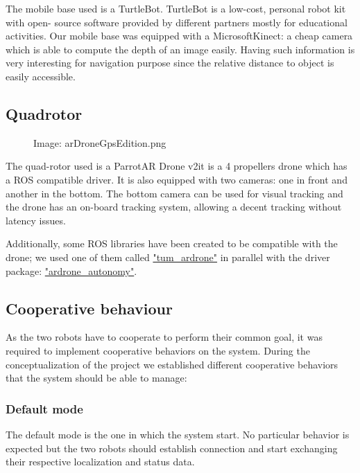\documentclass[11pt,a4paper]{article}
\newcommand{\centerImage}[1]{
	\begin{figure}[h]
	\centering
	Image: #1
	\end{figure}
}
\begin{document}
The mobile base used is a TurtleBot. TurtleBot is a low-cost, personal robot kit with open-
source software
provided by different partners mostly for educational activities.
Our mobile base was equipped with a Microsoft\textcopyright Kinect\texttrademark : a cheap 
camera which is
able to compute the depth of an image easily. Having such information is very interesting for 
navigation
purpose since the relative distance to object is easily accessible.

\subsection{Quadrotor}
\centerImage{arDroneGpsEdition.png}

The quad-rotor used is a Parrot\textcopyright AR Drone v2\texttrademark it is a 4 propellers
drone which has a ROS compatible driver. It is also equipped with two cameras: one in front
and another in the bottom. The bottom camera can be used for visual tracking and the drone
has an on-board tracking system, allowing a decent tracking without latency issues.

Additionally, some ROS libraries have been created to be compatible with the drone; we used
one of them called \href{"http://wiki.ros.org/tum_ardrone"}{"tum\_ardrone"} in parallel with
the driver package: \href{"https://github.com/AutonomyLab/ardrone_autonomy"}
{"ardrone\_autonomy"}.

\subsection{Cooperative behaviour}
As the two robots have to cooperate to perform their common goal, it was required to implement
cooperative behaviors on the system. During the conceptualization of the project we established different
cooperative behaviors that the system should be able to manage:


\subsubsection{Default mode}
The default mode is the one in which the system start. No particular behavior is expected but the two
robots should establish connection and start exchanging their respective localization and status data.
\end{document}
